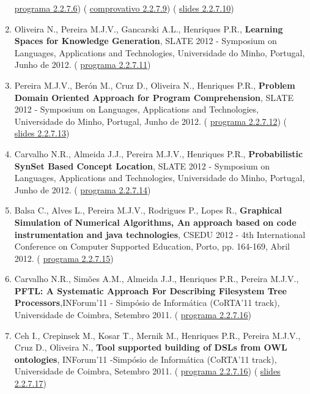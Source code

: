 \documentclass[11pt]{article}
\begin{document}
\begin{enumerate}
{\href{run:ComunicacoesOrais/programas/SLATE2013prog.pdf}{programa 2.2.7.6}) (
\href{run:ComunicacoesOrais/programas/SLATE2013NessyComp.pdf}{comprovativo 2.2.7.9}) (
\href{run:ComunicacoesOrais/Slate13Nessyapres.pdf}{slides 2.2.7.10})}
\item{Oliveira N., Pereira M.J.V., Gancarski A.L., Henriques P.R., {
\bf{ Learning Spaces for Knowledge Generation}}, SLATE 2012 - Symposium on Languages, Applications and Technologies, Universidade do Minho, Portugal, Junho de 2012. (
\href{run:ComunicacoesOrais/programas/SLATE2012prog.pdf}{programa 2.2.7.11})}
\item{Pereira M.J.V., Berón M., Cruz D., Oliveira N., Henriques P.R., {
\bf{ Problem Domain Oriented Approach for Program Comprehension}}, SLATE 2012 - Symposium on Languages, Applications and Technologies, Universidade do Minho, Portugal, Junho de 2012. (
\href{run:ComunicacoesOrais/programas/SLATE2012prog2.pdf}{programa 2.2.7.12}) (
\href{run:ComunicacoesOrais/Slate12apres.pdf}{slides 2.2.7.13})}
\item{Carvalho N.R., Almeida J.J., Pereira M.J.V., Henriques P.R., {
\bf{ Probabilistic SynSet Based Concept Location}}, SLATE 2012 - Symposium on Languages, Applications and Technologies, Universidade do Minho, Portugal, Junho de 2012. (
\href{run:ComunicacoesOrais/programas/SLATE2012prog2.pdf}{programa 2.2.7.14})}
\item{Balsa C., Alves L., Pereira M.J.V., Rodrigues P., Lopes R., {
\bf{ Graphical Simulation of Numerical Algorithms, An approach based on code instrumentation and java technologies}}, CSEDU 2012 - 4th International Conference on Computer Supported Education, Porto, pp. 164-169, Abril 2012. (
\href{run:ComunicacoesOrais/programas/CSEDU2012prog.pdf}{programa 2.2.7.15})}
\item{Carvalho N.R., Simões A.M., Almeida J.J., Henriques P.R., Pereira M.J.V., {
\bf{ PFTL: A Systematic Approach For Describing Filesystem Tree Processors}},INForum'11 - Simpósio de Informática (CoRTA'11 track), Universidade de Coimbra, Setembro 2011. (
\href{run:ComunicacoesOrais/programas/INForum2011prog.pdf}{programa 2.2.7.16})}
\item{Ceh I., Crepinsek M., Kosar T., Mernik M., Henriques P.R., Pereira M.J.V., Cruz D., Oliveira N.,{
\bf{ Tool supported building of {DSL}}s from {OWL} ontologies}, INForum'11 -Simpósio de Informática (CoRTA'11 track), Universidade de Coimbra, Setembro 2011. (
\href{run:ComunicacoesOrais/programas/INForum2011prog.pdf}{programa 2.2.7.16}) (
\href{run:ComunicacoesOrais/Corta11apres.pdf}{slides 2.2.7.17})}

\end{enumerate}
\end{document}
